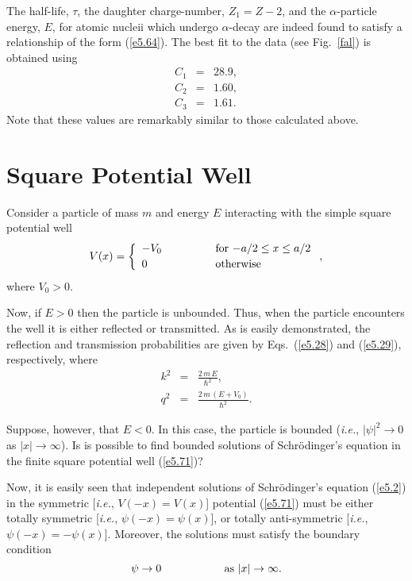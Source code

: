 The half-life, $\tau$,  the daughter charge-number, $Z_1=Z-2$, and
the $\alpha$-particle energy, $E$, for atomic nucleii which undergo $\alpha$-decay
are indeed found to satisfy a relationship of the form (\ref{e5.64}). The
best fit to the data (see Fig.~\ref{fal}) is obtained using
\begin{eqnarray}
C_1 &= &28.9,\\[0.5ex]
C_2 &=& 1.60,\\[0.5ex]
C_3 &=& 1.61.
\end{eqnarray}
Note that these values are remarkably similar to those calculated above.

\section{Square Potential Well}
Consider a particle of mass $m$ and energy $E$ interacting with the
simple square potential well
\begin{equation}\label{e5.71}
V(x) = \left\{\begin{array}{lcl}
-V_0&\mbox{\hspace{1cm}}&\mbox{for $-a/2\leq x\leq a/2$}\\[0.5ex]
0&&\mbox{otherwise}
\end{array}
\right.,
\end{equation}
where $V_0>0$. 

Now, if $E>0$ then the particle is unbounded. Thus, when the particle encounters the well
it is either reflected or transmitted. As is easily demonstrated, the reflection and transmission
probabilities are given by Eqs.~(\ref{e5.28}) and (\ref{e5.29}), respectively,
where
\begin{eqnarray}
k^2&=& \frac{2\,m\,E}{\hbar^2},\\[0.5ex]
q^2 &=& \frac{2\,m\,(E+V_0)}{\hbar^2}.
\end{eqnarray}

Suppose, however, that $E<0$. In this case, the particle
is bounded ({\em i.e.}, $|\psi|^2\rightarrow 0$ as $|x|\rightarrow\infty$). 
Is is possible to find bounded solutions of Schr\"{o}dinger's equation
in  the  finite square potential well (\ref{e5.71})? 

Now, it is easily seen that  independent solutions of Schr\"{o}dinger's equation (\ref{e5.2})
in the symmetric [{\em i.e.}, $V(-x)=V(x)$] potential (\ref{e5.71})
must be either totally symmetric [{\em i.e.}, $\psi(-x)=\psi(x)$], or
totally anti-symmetric [{\em i.e.}, $\psi(-x) =-\psi(x)$]. Moreover,
the solutions must satisfy the boundary condition
\begin{equation}
\psi\rightarrow 0\mbox{\hspace{2cm}as $|x|\rightarrow\infty$}.
\end{equation}


